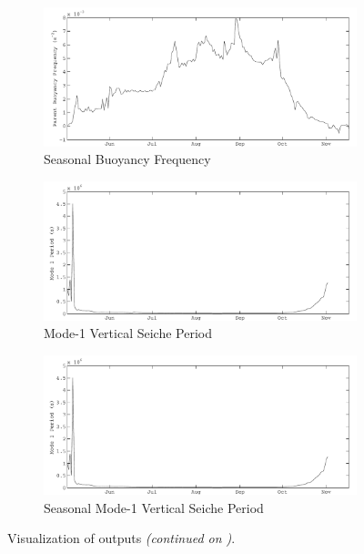 \begin{figure}
\begin{subfigure}{\lafigsize}
		\end{subfigure}
		\begin{subfigure}{\lafigsize}
			\caption{\label{fig:la:out:SN2}Seasonal Buoyancy Frequency}
			\includegraphics[width=\textwidth]{figures/Sparkling_SN2.pdf}
		\end{subfigure}
		\begin{subfigure}{\lafigsize}
			\caption{\label{fig:la:out:T1}Mode-1 Vertical Seiche Period}
			\includegraphics[width=\textwidth]{figures/Sparkling_T1.pdf}
		\end{subfigure}
		\begin{subfigure}{\lafigsize}
			\caption{\label{fig:la:out:ST1}Seasonal Mode-1 Vertical Seiche Period}
			\includegraphics[width=\textwidth]{figures/Sparkling_ST1.pdf}
		\end{subfigure}
		\caption{\label{fig:la:outputs:1}Visualization of \la outputs \emph{(continued on )}.}
	\end{figure}
